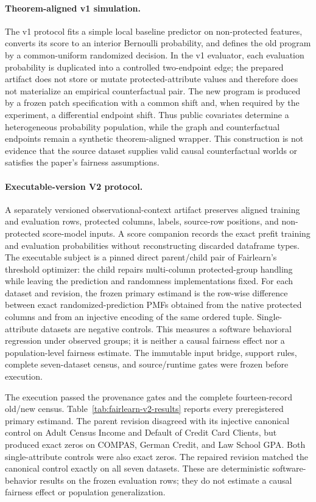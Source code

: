 \paragraph{Theorem-aligned v1 simulation.}
The v1 protocol fits a simple local baseline predictor on non-protected
features, converts its score to an interior Bernoulli probability, and defines
the old program by a common-uniform randomized decision. In the v1 evaluator,
each evaluation probability is duplicated into a controlled two-endpoint edge;
the prepared artifact does not store or mutate protected-attribute values and
therefore does not materialize an empirical counterfactual pair. The new program
is produced by a frozen patch specification with a common shift and, when
required by the experiment, a differential endpoint shift. Thus public
covariates determine a heterogeneous probability population, while the graph
and counterfactual endpoints remain a synthetic theorem-aligned wrapper. This
construction is not evidence that the source dataset supplies valid causal
counterfactual worlds or satisfies the paper's fairness assumptions.

\paragraph{Executable-version V2 protocol.}
A separately versioned observational-context artifact preserves aligned
training and evaluation rows, protected columns, labels, source-row positions,
and non-protected score-model inputs. A score companion records the exact
prefit training and evaluation probabilities without reconstructing discarded
dataframe types. The executable subject is a pinned direct parent/child pair of
Fairlearn's threshold optimizer: the child repairs multi-column protected-group
handling while leaving the prediction and randomness implementations fixed.
For each dataset and revision, the frozen primary estimand is the row-wise
difference between exact randomized-prediction PMFs obtained from the native
protected columns and from an injective encoding of the same ordered tuple.
Single-attribute datasets are negative controls. This measures a software
behavioral regression under observed groups; it is neither a causal fairness
effect nor a population-level fairness estimate. The immutable input bridge,
support rules, complete seven-dataset census, and source/runtime gates were
frozen before execution.

The execution passed the provenance gates and the complete fourteen-record
old/new census.  Table~\ref{tab:fairlearn-v2-results} reports every
preregistered primary estimand.  The parent revision disagreed with its injective
canonical control on Adult Census Income and Default of Credit Card Clients,
but produced exact zeros on COMPAS, German Credit, and Law School GPA.  Both
single-attribute controls were also exact zeros.  The repaired revision matched
the canonical control exactly on all seven datasets.  These are deterministic
software-behavior results on the frozen evaluation rows; they do not estimate a
causal fairness effect or population generalization.

